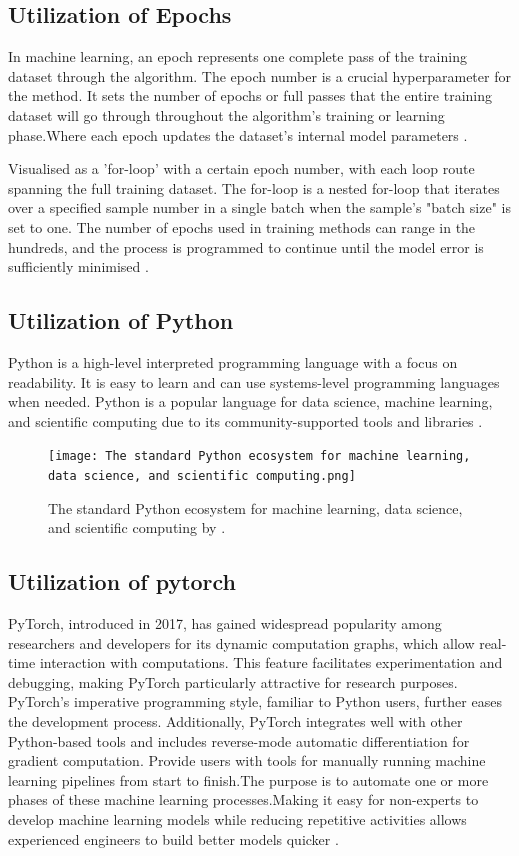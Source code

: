 \documentclass[conference]{IEEEtran}
\begin{document}
\subsection{Utilization of Epochs}
In machine learning, an epoch represents one complete pass of the training dataset through the algorithm. The epoch number is a crucial hyperparameter for the method. It sets the number of epochs or full passes that the entire training dataset will go through throughout the algorithm's training or learning phase.Where each epoch updates the dataset's internal model parameters \cite{b8}.

Visualised as a 'for-loop' with a certain epoch number, with each loop route spanning the full training dataset. The for-loop is a nested for-loop that iterates over a specified sample number in a single batch when the sample's "batch size" is set to one. The number of epochs used in training methods can range in the hundreds, and the process is programmed to continue until the model error is sufficiently minimised \cite{b8}.
\subsection{Utilization of Python}
Python is a high-level interpreted programming language with a focus on readability. It is easy to learn and can use systems-level programming languages when needed. Python is a popular language for data science, machine learning, and scientific computing due to its community-supported tools and libraries \cite{b9}.

\begin{figure}[h]
    \centering
    \texttt{[image: The standard Python ecosystem for machine learning, data science, and scientific computing.png]}
    \caption{The standard Python ecosystem for machine learning, data science, and scientific computing by \cite{b9}.}
    \label{fig}
\end{figure}

\subsection{Utilization of pytorch}
PyTorch, introduced in 2017, has gained widespread popularity among researchers and developers for its dynamic computation graphs, which allow real-time interaction with computations. This feature facilitates experimentation and debugging, making PyTorch particularly attractive for research purposes. PyTorch's imperative programming style, familiar to Python users, further eases the development process. Additionally, PyTorch integrates well with other Python-based tools and includes reverse-mode automatic differentiation for gradient computation. Provide users with tools for manually running machine learning pipelines from start to finish.The purpose is to automate one or more phases of these machine learning processes.Making it easy for non-experts to develop machine learning models while reducing repetitive activities allows experienced engineers to build better models quicker \cite{b9}.
\end{document}
